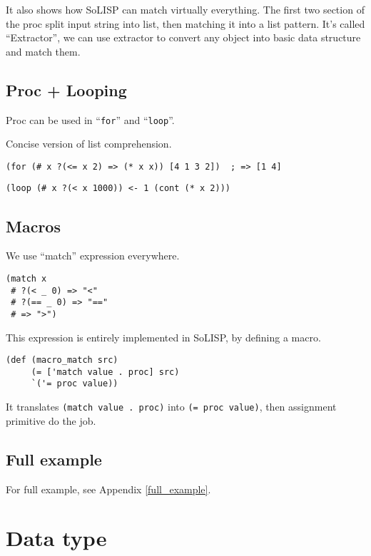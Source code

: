 \documentclass[a4paper,11pt]{article}
\begin{document}
It also shows how SoLISP can match virtually everything. The first two section of the proc split input string into list, then matching it into a list pattern. It's called ``Extractor'', we can use extractor to convert any object into basic data structure and match them.

\subsection{Proc + Looping}

Proc can be used in ``\verb|for|'' and ``\verb|loop|''.

Concise version of list comprehension. 

\begin{verbatim}
(for (# x ?(<= x 2) => (* x x)) [4 1 3 2])  ; => [1 4]
\end{verbatim}

\begin{verbatim}
(loop (# x ?(< x 1000)) <- 1 (cont (* x 2)))
\end{verbatim}

\subsection{Macros}

We use ``match'' expression everywhere.

\begin{verbatim}
(match x
 # ?(< _ 0) => "<"
 # ?(== _ 0) => "=="
 # => ">")
\end{verbatim}

This expression is entirely implemented in SoLISP, by defining a macro.

\begin{verbatim}
(def (macro_match src)
     (= ['match value . proc] src)
     `('= proc value))
\end{verbatim}

It translates \verb|(match value . proc)| into \verb|(= proc value)|, then assignment primitive do the job.

\subsection{Full example}

For full example, see Appendix \ref{full_example}.

\section{Data type}
\end{document}
